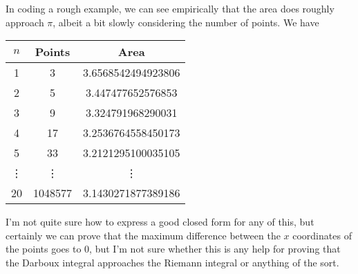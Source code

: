 \documentclass{article}
\begin{document}
In coding a rough example, we can see empirically that the area does roughly
approach \( \pi \), albeit a bit slowly considering the number of points. We have
\begin{center}
\begin{tabular}{c|c|c}
    \( n \) & Points & Area \\
    \hline
    1 & 3 & 3.6568542494923806\\
    2 & 5 &  3.447477652576853 \\
    3 & 9 &  3.324791968290031 \\
    4 & 17 & 3.2536764558450173 \\
    5 & 33 & 3.2121295100035105 \\
    \vdots & \vdots & \vdots \\
    20 & 1048577 & 3.1430271877389186 
\end{tabular}
\end{center}
I'm not quite sure how to express a good closed form for any of this, but
certainly we can prove that the maximum difference between the \( x \)
coordinates of the points goes to \( 0 \), but I'm not sure whether this is any
help for proving that the Darboux integral approaches the Riemann integral or
anything of the sort.

\vspace{0.5cm}
\end{document}
